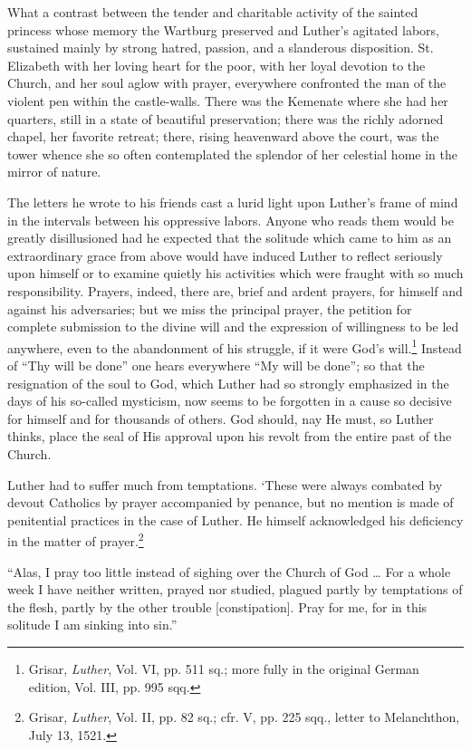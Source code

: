 What a contrast between the tender and charitable activity of the
sainted princess whose memory the Wartburg preserved and Luther’s
agitated labors, sustained mainly by strong hatred, passion, and a
slanderous disposition. St. Elizabeth with her loving heart for the
poor, with her loyal devotion to the Church, and her soul aglow with
prayer, everywhere confronted the man of the violent pen within
the castle-walls. There was the Kemenate where she had her quarters,
still in a state of beautiful preservation; there was the richly adorned
chapel, her favorite retreat; there, rising heavenward above the court,
was the tower whence she so often contemplated the splendor of her
celestial home in the mirror of nature.

The letters he wrote to his friends cast a lurid light upon Luther’s
frame of mind in the intervals between his oppressive labors. Anyone
who reads them would be greatly disillusioned had he expected that
the solitude which came to him as an extraordinary grace from above
would have induced Luther to reflect seriously upon himself or to examine
quietly his activities which were fraught with so much responsibility.
Prayers, indeed, there are, brief and ardent prayers, for
himself and against his adversaries; but we miss the principal prayer,
the petition for complete submission to the divine will and the expression
of willingness to be led anywhere, even to the abandonment
of his struggle, if it were God’s will.\footnote
{Grisar, \textit{Luther}, Vol. VI, pp. 511 sq.; more fully in the original German edition, Vol.
III, pp. 995 sqq.}
Instead of “Thy will be
done” one hears everywhere “My will be done”; so that the resignation of
the soul to God, which Luther had so strongly emphasized in
the days of his so-called mysticism, now seems to be forgotten in a
cause so decisive for himself and for thousands of others. God should,
nay He must, so Luther thinks, place the seal of His approval upon
his revolt from the entire past of the Church.

Luther had to suffer much from temptations. ‘These were always
combated by devout Catholics by prayer accompanied by penance,
but no mention is made of penitential practices in the case of Luther.
He himself acknowledged his deficiency in the matter of prayer.\footnote
{Grisar, \textit{Luther}, Vol. II, pp. 82 sq.; cfr. V, pp. 225 sqq., letter to Melanchthon, July
13, 1521.}

“Alas, I pray too little instead of sighing over the Church of God \dots
For a whole week I have neither written, prayed nor studied, plagued
partly by temptations of the flesh, partly by the other trouble [constipation].
Pray for me, for in this solitude I am sinking into sin.”

